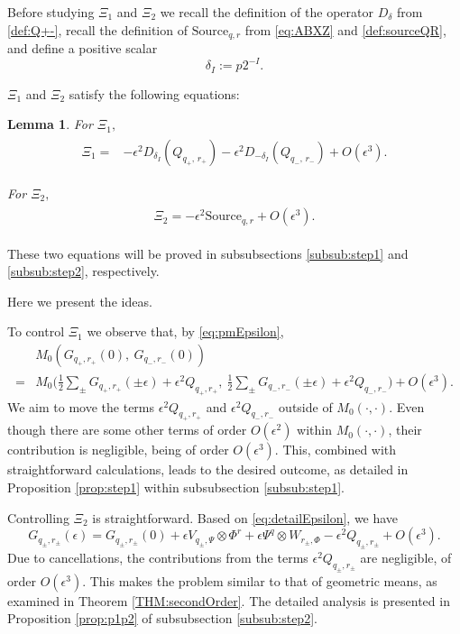 \documentclass{article}
\numberwithin{equation}{section}
\newtheorem{lemma}[theorem]{Lemma}
\begin{document}
Before studying $\Xi_1$ and $\Xi_2$ we recall the definition of the operator $D_{\delta}$ from \eqref{def:Q+-}, recall the definition of $\text{Source}_{q,r}$ from \eqref{eq:ABXZ} and \eqref{def:sourceQR}, and define a positive scalar $$\delta_I:=p 2^{-I}.$$

$\Xi_1$ and $\Xi_2$ satisfy the following equations:
\begin{lemma}
For $\Xi_1,$
\begin{align}\label{eq:step1}
\begin{split}
\Xi_1=
&-\epsilon^2 D_{\delta_{I} }(Q_{q_+, \, r_+})-\epsilon^2 D_{-\delta_{I} }(Q_{q_-, \, r_-})+ O(\epsilon^3).
\end{split}
\end{align}

For $\Xi_2,$
\begin{align}\label{eq:step2}
\begin{split}
\Xi_2
=-\epsilon^2 \text{Source}_{q,r}+O(\epsilon^3).
\end{split}
\end{align}
\end{lemma}
These two equations will be proved in subsubsections \ref{subsub:step1} and \ref{subsub:step2}, respectively.

Here we present the ideas.

To control $\Xi_1$ we observe that, by \eqref{eq:pmEpsilon},
\begin{align}
& M_0 \left( G_{q_+, r_+}(0), \ G_{q_-, r_-}(0) \right) \nonumber\\
=& M_0 \Big( \frac{1}{2} \sum_{\pm}G_{q_+, r_+}(\pm\epsilon)  + \epsilon^2 Q_{q_+, r_+}, \ \frac{1}{2} \sum_{\pm}G_{q_-, r_-}(\pm\epsilon)  + \epsilon^2 Q_{q_-, r_-} \Big)+ O(\epsilon^3).\label{eq:TwoSecondOrder}
\end{align}
We aim to move the terms $\epsilon^2 Q_{q_+, r_+}$ and $\epsilon^2 Q_{q_-, r_-}$ outside of $M_0(\cdot,\cdot)$. Even though there are some other terms of order $O(\epsilon^2)$ within $M_0(\cdot,\cdot)$, their contribution is negligible, being of order $O(\epsilon^3)$. This, combined with straightforward calculations, leads to the desired outcome, as detailed in Proposition \ref{prop:step1} within subsubsection \ref{subsub:step1}.

Controlling $\Xi_2$ is straightforward. Based on \eqref{eq:detailEpsilon}, we have
\[
G_{q_{\pm}, r_{\pm}}(\epsilon) = G_{q_{\pm}, r_{\pm}}(0) +  \epsilon V_{q_{\pm},\Psi}\otimes \Phi^r+\epsilon \Psi^q\otimes W_{r_{\pm},\Phi} - \epsilon^2 Q_{q_{\pm}, r_{\pm}} + O(\epsilon^3).
\]
Due to cancellations, the contributions from the terms $\epsilon^2 Q_{q_{\pm}, r_{\pm}}$ are negligible, of order $O(\epsilon^3)$. This makes the problem similar to that of geometric means, as examined in Theorem \ref{THM:secondOrder}. The detailed analysis is presented in Proposition \ref{prop:p1p2} of subsubsection \ref{subsub:step2}.
\end{document}
